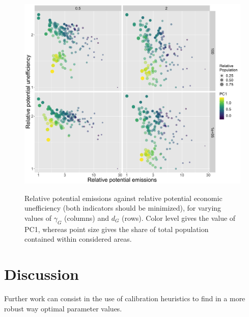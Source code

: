 \documentclass{jimis-en}
\begin{document}
\begin{figure}[ht] 
  {\includegraphics[width=\linewidth]{figures/aggreg_morpho_relemissions-relefficiency_colpc1_logscale_targeted.png}}
  \centering  
  \caption{Relative potential emissions against relative potential economic unefficiency (both indicators should be minimized), for varying values of $\gamma_G$ (columns) and $d_G$ (rows). Color level gives the value of PC1, whereas point size gives the share of total population contained within considered areas.\label{fig:paretos-relative}}
\end{figure}







\section{Discussion}

Further work can consist in the use of calibration heuristics \citep{reuillon2013openmole} to find in a more robust way optimal parameter values.





\end{document}
